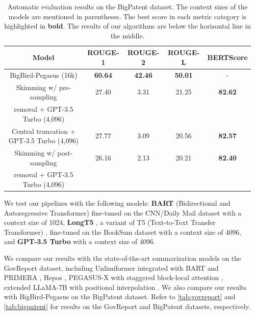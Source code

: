 \begin{table}[!ht]
  \centering

  \begin{tabular}{c c c c c}
    \hline
    Model & ROUGE-1 & ROUGE-2 & ROUGE-L & BERTScore \\
    \hline
    BigBird-Pegasus (16k) & \textbf{60.64} & \textbf{42.46} & \textbf{50.01} & - \\
    \hline
    Skimming w/ pre-sampling & 27.40 & 3.31 & 21.25 & \textbf{82.62} \\
    removal + GPT-3.5 Turbo (4,096) & & & & \\
    Central truncation + GPT-3.5 Turbo (4,096) & 27.77 & 3.09 & 20.56 & \textbf{82.57} \\
    Skimming w/ post-sampling & 26.16 & 2.13 & 20.21 & \textbf{82.40} \\
    removal + GPT-3.5 Turbo (4,096) & & & & \\
    \hline
  \end{tabular}

  \caption{
    Automatic evaluation results on the BigPatent dataset. The context sizes of the models are mentioned in parentheses.
    The best score in each metric category is highlighted in \textbf{bold}.
    The results of our algorithms are below the horizontal line in the middle.
  }
  \label{tab:bigpatent}
\end{table}

We test our pipelines with the following models: \textbf{BART} (Bidirectional and Autoregressive Transformer) \cite{lewis-etal-2020-bart} fine-tuned on the CNN/Daily Mail dataset \cite{nallapati2016abstractive} with a context size of 1024, \textbf{LongT5} \cite{guo2021longt5}, a variant of T5 (Text-to-Text Transfer Transformer) \cite{raffel2020exploring}, fine-tuned on the BookSum dataset with a context size of 4096, and \textbf{GPT-3.5 Turbo} \cite{brown2020language} with a context size of 4096.

We compare our results with the state-of-the-art summarization models on the GovReport dataset, including Unlimiformer \cite{bertsch2023unlimiformer} integrated with BART \cite{lewis-etal-2020-bart} and PRIMERA \cite{beltagy2020longformer}, Hepos \cite{huang-etal-2021-efficient}, PEGASUS-X with staggered block-local attention \cite{phang2022investigating}, extended	LLaMA-7B with positional interpolation \cite{chen2023extending}.
We also compare our results with BigBird-Pegasus \cite{zaheer2020big} on the BigPatent dataset.
Refer to \autoref{tab:govreport} and \autoref{tab:bigpatent} for results on the GovReport and BigPatent datasets, respectively.

